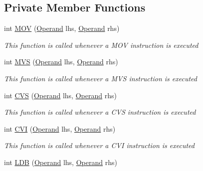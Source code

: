 \subsection*{Private Member Functions}
\begin{DoxyCompactItemize}
\item 
int \hyperlink{class_c_p_u___o_s___simulator_1_1_c_p_u_1_1_instruction_af6548da603e7370f10de03e0da040a24}{M\+O\+V} (\hyperlink{class_c_p_u___o_s___simulator_1_1_c_p_u_1_1_operand}{Operand} lhs, \hyperlink{class_c_p_u___o_s___simulator_1_1_c_p_u_1_1_operand}{Operand} rhs)
\begin{DoxyCompactList}\small\item\em This function is called whenever a M\+O\+V instruction is executed \end{DoxyCompactList}\item 
int \hyperlink{class_c_p_u___o_s___simulator_1_1_c_p_u_1_1_instruction_a33723518d4e117877d2ecf5b861d2eb2}{M\+V\+S} (\hyperlink{class_c_p_u___o_s___simulator_1_1_c_p_u_1_1_operand}{Operand} lhs, \hyperlink{class_c_p_u___o_s___simulator_1_1_c_p_u_1_1_operand}{Operand} rhs)
\begin{DoxyCompactList}\small\item\em This function is called whenever a M\+V\+S instruction is executed \end{DoxyCompactList}\item 
int \hyperlink{class_c_p_u___o_s___simulator_1_1_c_p_u_1_1_instruction_a689065741dc51ddacf955b3781570546}{C\+V\+S} (\hyperlink{class_c_p_u___o_s___simulator_1_1_c_p_u_1_1_operand}{Operand} lhs, \hyperlink{class_c_p_u___o_s___simulator_1_1_c_p_u_1_1_operand}{Operand} rhs)
\begin{DoxyCompactList}\small\item\em This function is called whenever a C\+V\+S instruction is executed \end{DoxyCompactList}\item 
int \hyperlink{class_c_p_u___o_s___simulator_1_1_c_p_u_1_1_instruction_af73e92c10474c39863df39c1f826ff50}{C\+V\+I} (\hyperlink{class_c_p_u___o_s___simulator_1_1_c_p_u_1_1_operand}{Operand} lhs, \hyperlink{class_c_p_u___o_s___simulator_1_1_c_p_u_1_1_operand}{Operand} rhs)
\begin{DoxyCompactList}\small\item\em This function is called whenever a C\+V\+I instruction is executed \end{DoxyCompactList}\item 
int \hyperlink{class_c_p_u___o_s___simulator_1_1_c_p_u_1_1_instruction_ae09705d74d57f968b93ba1739832488f}{L\+D\+B} (\hyperlink{class_c_p_u___o_s___simulator_1_1_c_p_u_1_1_operand}{Operand} lhs, \hyperlink{class_c_p_u___o_s___simulator_1_1_c_p_u_1_1_operand}{Operand} rhs)

\end{DoxyCompactItemize}
